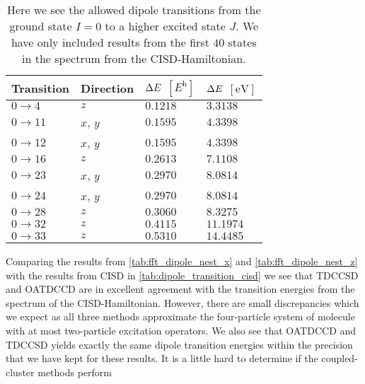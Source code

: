         \begin{table}
            \centering
            \caption{Here we see the allowed dipole transitions from the ground
            state $I = 0$ to a higher excited state $J$.
            We have only included results from the first $40$ states in the
            spectrum from the CISD-Hamiltonian.}
            \renewcommand{\arraystretch}{1.3}
            \begin{tabular}{@{}llll@{}}
                \toprule
                Transition & Direction
                &$\Delta E$ $[\si{\hartree}]$
                & $\Delta E$ $[\si{\electronvolt}]$ \\
                \midrule
                $0 \to 4$ & $z$ & $0.1218$ & $3.3138$ \\
                $0 \to 11$ & $x$, $y$ & $0.1595$ & $4.3398$ \\
                $0 \to 12$ & $x$, $y$ & $0.1595$ & $4.3398$ \\
                $0 \to 16$ & $z$ & $0.2613$ & $7.1108$ \\
                $0 \to 23$ & $x$, $y$ & $0.2970$ & $8.0814$ \\
                $0 \to 24$ & $x$, $y$ & $0.2970$ & $8.0814$ \\
                $0 \to 28$ & $z$ & $0.3060$ & $8.3275$ \\
                $0 \to 32$ & $z$ & $0.4115$ & $11.1974$ \\
                $0 \to 33$ & $z$ & $0.5310$ & $14.4485$ \\
                \bottomrule
            \end{tabular}
            \label{tab:dipole_transition_cisd}
        \end{table}
        Comparing the results from \autoref{tab:fft_dipole_nest_x} and
        \autoref{tab:fft_dipole_nest_z} with the results from CISD in
        \autoref{tab:dipole_transition_cisd} we see that TDCCSD and OATDCCD are
        in excellent agreement with the transition energies from the spectrum of
        the CISD-Hamiltonian.
        However, there are small discrepancies which we expect as all three
        methods approximate the four-particle system of  molecule with
        at most two-particle excitation operators.
        We also see that OATDCCD and TDCCSD yields exactly the same dipole
        transition energies within the precision that we have kept for these
        results.
        It is a little hard to determine if the coupled-cluster methods perform

